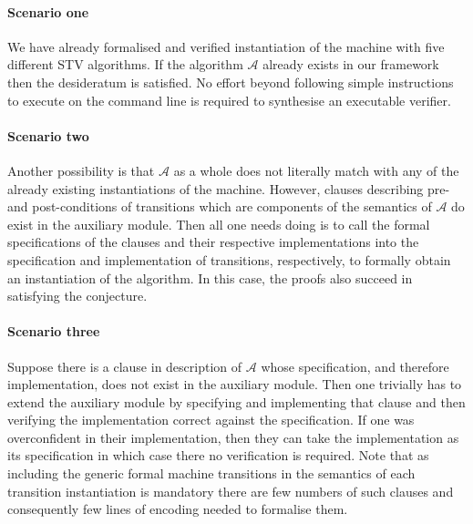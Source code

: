 \documentclass[10pt,conference]{IEEEtran}
\begin{document}
 \paragraph*{Scenario one} We have already formalised and verified instantiation of the machine with five different STV algorithms. If the algorithm $\mathcal{A}$ already exists in our framework then the desideratum is satisfied. No effort beyond following simple instructions to execute on the command line is required to synthesise an executable verifier.  
 \paragraph*{Scenario two} Another possibility is that 
 $\mathcal{A}$ as a whole does not literally match with any of the already existing instantiations of the machine. However, clauses describing pre- and post-conditions of transitions which are components of the semantics of $\mathcal{A}$ do exist in the auxiliary module. Then all one needs doing is to call the formal  specifications of the clauses and their respective implementations into the specification and implementation of transitions, respectively,  to formally obtain an instantiation of the algorithm. In this case, the proofs also succeed in satisfying the conjecture. 
 \paragraph*{Scenario three} 
 Suppose there is a clause in description of $\mathcal{A}$ whose specification, and  therefore implementation,  does not exist in the auxiliary module. Then one trivially has to extend the auxiliary module by specifying and implementing that clause and then verifying the implementation correct against the specification.  If one was overconfident in their implementation, then they can take the implementation as its specification in which case there no verification is required.  Note that as including the generic formal machine transitions in the semantics of each transition instantiation is mandatory 
 there are few  numbers of such clauses and consequently few lines of encoding needed to formalise them. 
 
\end{document}
